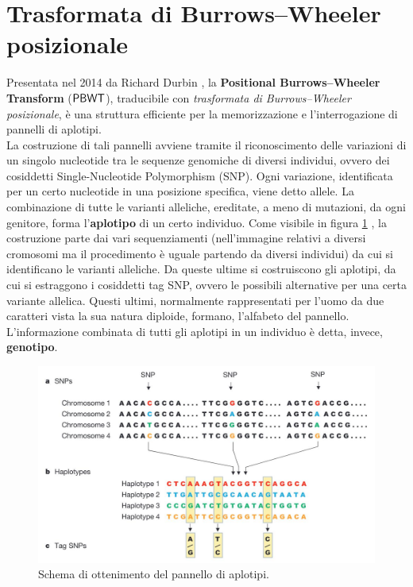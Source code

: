 \section{Trasformata di Burrows--Wheeler posizionale}
\label{secpbwt}
Presentata nel 2014 da Richard Durbin \cite{pbwt}, la \textbf{Positional
  Burrows--Wheeler Transform} ($\mbox{\rm {\sf PBWT}}$), traducibile con
\textit{trasformata di Burrows--Wheeler posizionale}, è una struttura efficiente
per la memorizzazione e l'interrogazione di pannelli di aplotipi.\\
La costruzione di tali pannelli avviene tramite il riconoscimento delle
variazioni di un singolo nucleotide tra le sequenze genomiche di diversi
individui, ovvero dei cosiddetti Single-Nucleotide Polymorphism
(SNP). Ogni variazione, identificata per un certo nucleotide in una
posizione specifica, viene 
detto allele. La combinazione di tutte le varianti alleliche,
ereditate, a meno di mutazioni, da ogni genitore, forma l'\textbf{aplotipo} di
un certo individuo. Come visibile in figura \ref{fig:haplo} \cite{haplo}, la 
costruzione parte dai
vari sequenziamenti (nell'immagine relativi a diversi cromosomi ma il
procedimento è uguale partendo da diversi individui) da cui si identificano le
varianti alleliche. Da queste ultime si costruiscono gli aplotipi, da cui si
estraggono i cosiddetti tag SNP, ovvero le possibili alternative per
una certa variante allelica. Questi ultimi, normalmente rappresentati per
l'uomo da due caratteri vista la sua natura diploide, formano,
l'alfabeto del pannello. 
L’informazione combinata di tutti gli aplotipi in un individuo è detta,
invece, \textbf{genotipo}.
\begin{figure}
  \centering
  \includegraphics[scale = 0.3]{img/haplo.jpg}
  \caption{Schema di ottenimento del pannello di aplotipi.}
  \label{fig:haplo}
\end{figure}
